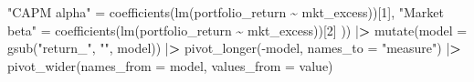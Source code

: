 \documentclass[
]{book}
\newenvironment{Shaded}{\begin{snugshade}}{\end{snugshade}}
\newcommand{\AttributeTok}[1]{\textcolor[rgb]{0.61,0.61,0.61}{#1}}
\newcommand{\DecValTok}[1]{\textcolor[rgb]{0.06,0.06,0.06}{#1}}
\newcommand{\ErrorTok}[1]{\textcolor[rgb]{0.14,0.14,0.14}{\textbf{#1}}}
\newcommand{\FunctionTok}[1]{\textcolor[rgb]{0,0,0}{#1}}
\newcommand{\NormalTok}[1]{#1}
\newcommand{\OtherTok}[1]{\textcolor[rgb]{0.37,0.37,0.37}{#1}}
\newcommand{\SpecialCharTok}[1]{\textcolor[rgb]{0,0,0}{#1}}
\newcommand{\StringTok}[1]{\textcolor[rgb]{0.5,0.5,0.5}{#1}}
\begin{document}
\begin{Shaded}
\begin{Highlighting}[]
      \StringTok{"CAPM alpha"} \OtherTok{=} \FunctionTok{coefficients}\NormalTok{(}\FunctionTok{lm}\NormalTok{(portfolio\_return }\SpecialCharTok{\textasciitilde{}}\NormalTok{ mkt\_excess))[}\DecValTok{1}\NormalTok{],}
      \StringTok{"Market beta"} \OtherTok{=} \FunctionTok{coefficients}\NormalTok{(}\FunctionTok{lm}\NormalTok{(portfolio\_return }\SpecialCharTok{\textasciitilde{}}\NormalTok{ mkt\_excess))[}\DecValTok{2}\NormalTok{]}
\NormalTok{    )) }\SpecialCharTok{|}\ErrorTok{\textgreater{}}
    \FunctionTok{mutate}\NormalTok{(}\AttributeTok{model =} \FunctionTok{gsub}\NormalTok{(}\StringTok{"return\_"}\NormalTok{, }\StringTok{""}\NormalTok{, model)) }\SpecialCharTok{|}\ErrorTok{\textgreater{}}
    \FunctionTok{pivot\_longer}\NormalTok{(}\SpecialCharTok{{-}}\NormalTok{model, }\AttributeTok{names\_to =} \StringTok{"measure"}\NormalTok{) }\SpecialCharTok{|}\ErrorTok{\textgreater{}}
    \FunctionTok{pivot\_wider}\NormalTok{(}\AttributeTok{names\_from =}\NormalTok{ model, }\AttributeTok{values\_from =}\NormalTok{ value)}


\end{Highlighting}
\end{Shaded}
\end{document}
